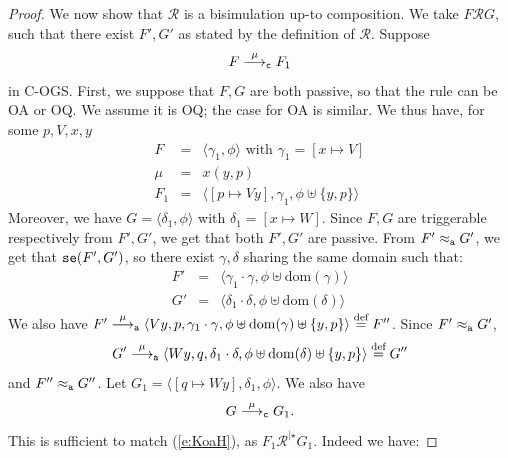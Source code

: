 \documentclass[11pt,a4paper]{amsart}
\theoremstyle{plain}
\theoremstyle{definition}
\theoremstyle{defC}
\theoremstyle{thmC}
\theoremstyle{plain}
\numberwithin{equation}{section}
\def\finish#1{\vskip.2cm\noindent{\em #1}%
  \marginpar{$\longleftarrow$}\vskip.2cm}
\newcommand{\finish}[1]{}
\newcommand{\COGS}{\mbox{{\rm C-OGS}}\xspace}      %
\newcommand{\uptoComp}[1]{\mathrel{#1^{|\star}}}
\newcommand{\okC}[2]{{\tt se}(#1,#2)}  %
\newcommand{\rmm}[1]{{\tt{\lowercase{#1}}}}
\newcommand{\genarr}[2]{\mathrel{\stackrel{{#1}}{\longrightarrow}_{\rmm{\lowercase{#2}}}}}
\newcommand{\arrA}[1]{\genarr{#1}{A}}  %
\newcommand{\arrC}[1]{\genarr{#1}{C}}   %
\newcommand{\genwb}[1]{\mathrel{\approx_{\rmm{\lowercase{#1}}}}}       %
\newcommand{\wbA}{\genwb{A}}       %
\def\R{{\mathcal R}}
\def\RR{\mathrel{\mathcal R}}
\def\defi{\stackrel{\mbox{\scriptsize {\rm{def}}}}{=}} %
\newcommand{\FF}{F}
\newcommand{\GG}{G}
\newcommand{\reff}[1]{(\ref{#1})}
\newcommand{\gj}[1]{\finish{{\bf GJ:} #1}}
\newcommand{\gj}[1]{}
\newcommand{\dom}[1]{\mathrm{dom}(#1)}
\newcommand{\pmap}[2]{[#1 \mapsto #2]}
\newcommand{\act}{\mu}
\newcommand{\questO}[2]{#1(#2)}
\newcommand{\conf}[1]{\langle #1\rangle}
\theoremstyle{plain}
\theoremstyle{definition}
\begin{document}
\begin{proof}
  We now show that $\R$ is a bisimulation up-to composition.
  We take $\FF \RR \GG$, such that there exist $\FF', \GG'$
  as stated by the definition of $\R$.
  Suppose 
  \begin{equation}
  \label{e:KoaH}
   \FF \arrC{\act} \FF_1 
  \end{equation} 
  in \COGS.  
  First, we suppose that $\FF,\GG$ are both passive, 
  so that the rule can be OA or OQ.  
  We assume it is OQ; the case for OA is similar. 
  We thus have, for some $p,V,x,y$ 
  \[\begin{array}{rcl}
   \FF &=&  \conf{ \gamma_1, \phi} \mbox{ with }  \gamma_1 = \pmap{x}{V} \\
   \act & = & \questO{x}{y,p} \\
   \FF_1 & = & \conf{\pmap{p}{V y}, \gamma_1,\phi \uplus \{y,p\}}
  \end{array}\]
  Moreover, we have $\GG = \conf{ \delta_1, \phi}$ 
  with $\delta_1 = \pmap{x}{W}$.
  Since $\FF,\GG$ are triggerable respectively from $\FF',\GG'$,
  we get that both $\FF',\GG'$ are passive.
  From $\FF' \wbA \GG'$, we get that $\okC{\FF'}{\GG'}$,
  so there exist $\gamma, \delta$ sharing the same domain such that:  
  \[\begin{array}{rcl}
  \FF' & = & \conf{ \gamma_1 \cdot \gamma,\phi \uplus \dom{\gamma}} \\ 
  \GG' & = & \conf{ \delta_1 \cdot \delta,\phi \uplus \dom{\delta}} 
  \end{array}\]
  We also have 
  $ \FF' \arrA{\act} \conf{V y,p, \gamma_1 \cdot \gamma, \phi\uplus \dom{\gamma} \uplus \{y,p\}} 
  \defi \FF''$. 
  Since $\FF' \wbA \GG'$, 
  \[ \GG'  \arrA{\act} \conf{W y,q, \delta_1 \cdot \delta, \phi \uplus \dom{\delta} \uplus \{y,p\}}  
  \defi \GG''\]
  and $\FF'' \wbA \GG''$.
  Let $\GG_1 =   \conf{\pmap{q}{W y}, \delta_1,\phi}$.
  We also have 
  \[ \GG \arrC  \act \GG_1. \] 
  This is sufficient to match \reff{e:KoaH}, as 
  $\FF_1 \uptoComp \R  \GG_1$. Indeed we have:


\end{proof}
\end{document}
